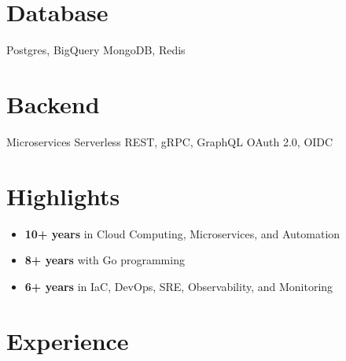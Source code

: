 \documentclass[]{cv-style}                     %
\begin{document}
\begin{aside}
\section{Database}
Postgres, BigQuery
MongoDB, Redis
%
\section{Backend}
Microservices
Serverless
REST, gRPC, GraphQL
OAuth 2.0, OIDC
%
%
\end{aside}



\section{Highlights}


\begin{itemize}
  \setlength{\itemsep}{-4pt}
  \item \textbf{10+ years} in Cloud Computing, Microservices, and Automation
  \item \textbf{8+ years} with Go programming
  \item \textbf{6+ years} in IaC, DevOps, SRE, Observability, and Monitoring
\end{itemize}



\section{Experience}
\end{document}
